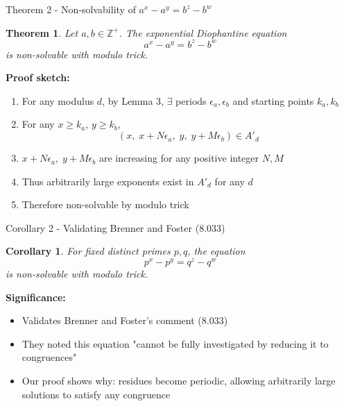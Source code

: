 ﻿\documentclass[10pt,aspectratio=169]{beamer}
\newtheorem{theorems}{Theorem}
\newtheorem{corollarys}{Corollary}
\begin{document}
\begin{frame}{Theorem 2 - Non-solvability of $a^x-a^y = b^z-b^w$}
    \begin{theorems}
        Let $a,b \in \mathbb{Z}^+$. The exponential Diophantine equation
        \[a^x - a^y = b^z - b^w\]
        is non-solvable with modulo trick.
    \end{theorems}
    
    \textbf{Proof sketch:}
    \begin{enumerate}
        \item For any modulus $d$, by Lemma 3, $\exists$ periods $\epsilon_a,\epsilon_b$ and starting points $k_a,k_b$
        \item For any $x \geq k_a$, $y \geq k_b$, 
            \[(x,\; x+N\epsilon_a,\; y,\; y+M\epsilon_b) \in A'_d\]
        \item $x+N\epsilon_a,\;y+M\epsilon_b $ are increasing for any positive integer $N,M$
        \item Thus arbitrarily large exponents exist in $A'_d$ for any $d$
        \item Therefore non-solvable by modulo trick
    \end{enumerate}
\end{frame}

\begin{frame}{Corollary 2 - Validating Brenner and Foster (8.033)}
    \begin{corollarys}
        For fixed distinct primes $p,q$, the equation
        \[p^x - p^y = q^z - q^w\]
        is non-solvable with modulo trick.
    \end{corollarys}
    
    \vspace{0.3cm}
    \textbf{Significance:}
    \begin{itemize}
        \item Validates Brenner and Foster's comment (8.033)
        \item They noted this equation "cannot be fully investigated by reducing it to congruences"
        \item Our proof shows why: residues become periodic, allowing arbitrarily large solutions to satisfy any congruence
    \end{itemize}
\end{frame}

\end{document}
